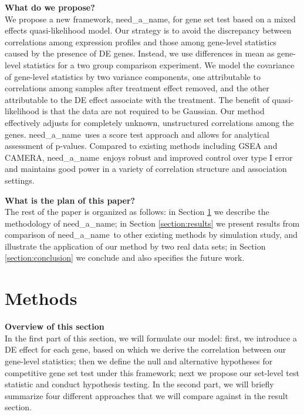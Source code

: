 \documentclass[useAMS,usenatbib, galley]{biom}
\newcommand{\OurMethod}{need\_a\_name}
\begin{document}
	
	
	\textbf{What do we propose?} \\
	
	We propose a new framework, \OurMethod, for gene set test based on a mixed effects quasi-likelihood model. Our strategy is to avoid the discrepancy between correlations among expression profiles and those among gene-level statistics caused by the presence of DE genes. Instead, we use differences in mean as gene-level statistics for a two group comparison experiment. We model the covariance of gene-level statistics by two variance components, one attributable to correlations among samples after treatment effect removed, and the other attributable to the DE effect associate with the treatment. The benefit of quasi-likelihood is that the data are not required to be Gaussian. Our method effectively adjusts for completely unknown, unstructured correlations among the genes. \OurMethod~uses a score test approach and allows for analytical assessment of p-values. Compared to existing methods including GSEA and CAMERA, \OurMethod~enjoys robust and improved control over type I error and maintains good power in a variety of correlation structure and association settings. 
	
	\textbf{What is the plan of this paper?} \\
	The rest of the paper is organized as follows: in Section \ref{section:methods} we describe the methodology of \OurMethod; in Section \ref{section:results} we present results from comparison of \OurMethod~to other existing methods by simulation study, and illustrate the application of our method by two real data sets; in Section \ref{section:conclusion} we conclude and also specifies the future work.
	
	
	
	\section{Methods}\label{section:methods}
	\textbf{Overview of this section} \\
	In the first part of this section, we will formulate our model: first, we introduce a DE effect for each gene, based on which we derive the correlation between our gene-level statistics; then we define the null and alternative hypotheses for competitive gene set test under this framework; next we propose our set-level test statistic and conduct hypothesis testing. In the second part, we will briefly summarize four different approaches that we will compare against in the result section.  
	
\end{document}

